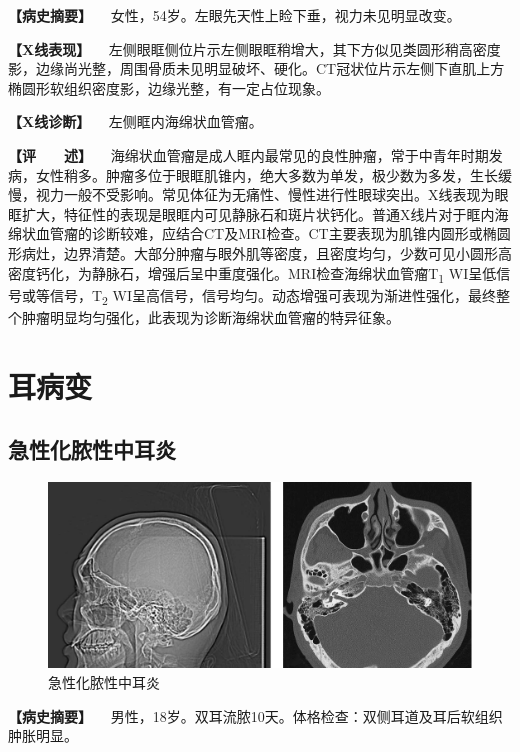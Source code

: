 \textbf{【病史摘要】}
　女性，54岁。左眼先天性上睑下垂，视力未见明显改变。

\textbf{【X线表现】}
　左侧眼眶侧位片示左侧眼眶稍增大，其下方似见类圆形稍高密度影，边缘尚光整，周围骨质未见明显破坏、硬化。CT冠状位片示左侧下直肌上方椭圆形软组织密度影，边缘光整，有一定占位现象。

\textbf{【X线诊断】} 　左侧眶内海绵状血管瘤。

\textbf{【评　　述】}
　海绵状血管瘤是成人眶内最常见的良性肿瘤，常于中青年时期发病，女性稍多。肿瘤多位于眼眶肌锥内，绝大多数为单发，极少数为多发，生长缓慢，视力一般不受影响。常见体征为无痛性、慢性进行性眼球突出。X线表现为眼眶扩大，特征性的表现是眼眶内可见静脉石和斑片状钙化。普通X线片对于眶内海绵状血管瘤的诊断较难，应结合CT及MRI检查。CT主要表现为肌锥内圆形或椭圆形病灶，边界清楚。大部分肿瘤与眼外肌等密度，且密度均匀，少数可见小圆形高密度钙化，为静脉石，增强后呈中重度强化。MRI检查海绵状血管瘤T\textsubscript{1}
WI呈低信号或等信号，T\textsubscript{2}
WI呈高信号，信号均匀。动态增强可表现为渐进性强化，最终整个肿瘤明显均匀强化，此表现为诊断海绵状血管瘤的特异征象。

\section{耳病变}

\subsection{急性化脓性中耳炎}

\begin{figure}[!htbp]
 \centering
 \includegraphics{./images/Image00424.jpg}
 \captionsetup{justification=centering}
 \caption{急性化脓性中耳炎}
 \label{fig7-3-1}
  \end{figure} 

\textbf{【病史摘要】}
　男性，18岁。双耳流脓10天。体格检查：双侧耳道及耳后软组织肿胀明显。

